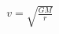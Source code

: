 \documentclass[preview]{standalone}
\begin{document}
\begin{align*}
v = \sqrt{\frac{GM}{r}}
\end{align*}
\end{document}
